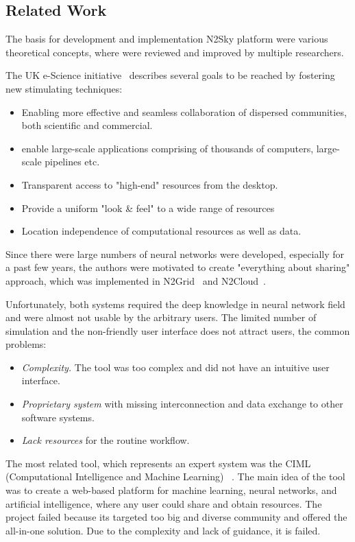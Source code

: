 \subsection{Related Work}\label{Related work}

The basis for development and implementation N2Sky platform were various theoretical concepts, where were reviewed and improved by multiple researchers.

The UK e-Science initiative~\cite{UKeS} describes several goals to be reached by fostering new stimulating techniques:

\begin{itemize}
  \item Enabling more effective and seamless collaboration of dispersed communities, both scientific and commercial.
  \item enable large-scale applications comprising of thousands of computers, large-scale pipelines etc.
  \item Transparent access to "high-end" resources from the desktop.
  \item Provide a uniform "look \& feel" to a wide range of resources
  \item Location independence of computational resources as well as data. 
\end{itemize}

Since there were large numbers of neural networks were developed, especially for a past few years, the authors were motivated to create "everything about sharing" approach, which was implemented in N2Grid~\cite{schikuta2004n2grid} and N2Cloud~\cite{huqqani2010n2cloud}.

Unfortunately, both systems required the deep knowledge in neural network field and were almost not usable by the arbitrary users.  The limited number of simulation and the non-friendly user interface does not attract users, the common problems:

\begin{itemize}
\item \emph{Complexity.} The tool was too complex and did not have an intuitive user interface. 
\item \emph{Proprietary system} with missing interconnection and data exchange to other software systems.
\item \emph{Lack resources} for the routine workflow.
\end{itemize}

The most related tool, which represents an expert system was the CIML (Computational Intelligence and Machine Learning) ~\cite{zurada2009building}. The main idea of the tool was to create a web-based platform for machine learning, neural networks, and artificial intelligence, where any user could share and obtain resources. The project failed because its targeted too big and diverse community and offered the all-in-one solution. Due to the complexity and lack of guidance, it is failed. 

